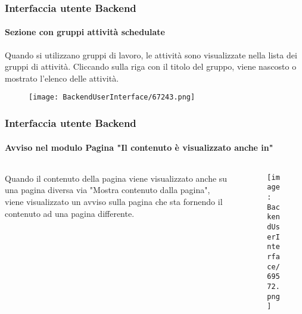 \begin{frame}[fragile]
	\frametitle{Interfaccia utente Backend}
	\framesubtitle{Sezione con gruppi attività schedulate}

	Quando si utilizzano gruppi di lavoro, le attività sono visualizzate nella lista dei gruppi di attività.
	Cliccando sulla riga con il titolo del gruppo, viene nascosto o mostrato l'elenco delle attività.

	\begin{figure}\vspace{-0.3cm}
		\texttt{[image: BackendUserInterface/67243.png]}
	\end{figure}

\end{frame}

\begin{frame}[fragile]
	\frametitle{Interfaccia utente Backend}
	\framesubtitle{Avviso nel modulo Pagina "Il contenuto è visualizzato anche in"}

	\begin{columns}[T]
		\begin{column}{.3\textwidth}
			Quando il contenuto della pagina viene visualizzato anche su una pagina diversa via	
			"Mostra contenuto dalla pagina", viene visualizzato un avviso sulla pagina che sta
			fornendo il contenuto ad una pagina differente.
		\end{column}

		\begin{column}{.7\textwidth}
			\begin{figure}\vspace*{-0.6cm}
				\texttt{[image: BackendUserInterface/69572.png]}
			\end{figure}
		\end{column}
	\end{columns}

\end{frame}

